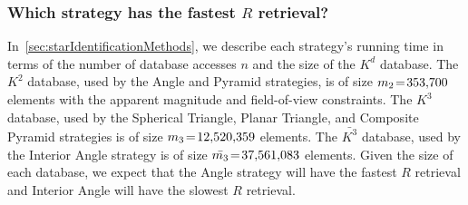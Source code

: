\begin{table}
\end{table}

\subsubsection{Which strategy has the fastest $R$ retrieval?}
In~\autoref{sec:starIdentificationMethods}, we describe each strategy's running time in terms of the number of database
accesses $n$ and the size of the $K^d$ database.
The $K^2$ database, used by the Angle and Pyramid strategies, is of size $m_2 \!=\! 353{,}700$ elements with the apparent
magnitude and field-of-view constraints.
The $K^3$ database, used by the Spherical Triangle, Planar Triangle, and Composite Pyramid strategies is of size
$m_3 \!=\! 12{,}520{,}359$ elements.
The $\bar{K^3}$ database, used by the Interior Angle strategy is of size $\bar{m_3} \!=\! 37{,}561{,}083$ elements.
Given the size of each database, we expect that the Angle strategy will have the fastest $R$ retrieval and
Interior Angle will have the slowest $R$ retrieval.


